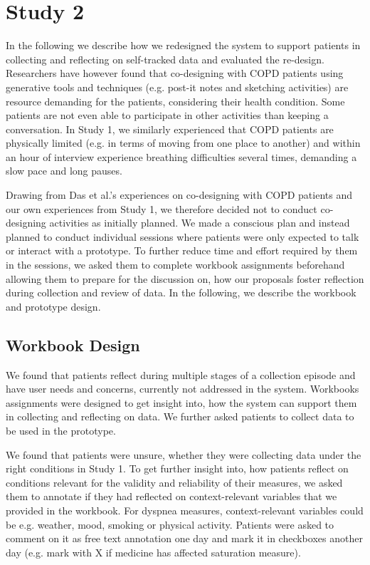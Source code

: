 \section{Study 2}
In the following we describe how we redesigned the system to support patients in collecting and reflecting on self-tracked data and evaluated the re-design. Researchers have however found that co-designing with COPD patients using generative tools and techniques (e.g. post-it notes and sketching activities) are resource demanding for the patients, considering their health condition. Some patients are not even able to participate in other activities than keeping a conversation. In Study 1, we similarly experienced that COPD patients are physically limited (e.g. in terms of moving from one place to another) and within an hour of interview experience breathing difficulties several times, demanding a slow pace and long pauses. 

Drawing from Das et al.’s experiences on co-designing with COPD patients \cite{Das} and our own experiences from Study 1, we therefore decided not to conduct co-designing activities as initially planned. We made a conscious plan and instead planned to conduct individual sessions where patients were only expected to talk or interact with a prototype. To further reduce time and effort required by them in the sessions, we asked them to complete workbook assignments beforehand allowing them to prepare for the discussion on, how our proposals foster reflection during collection and review of data. In the following, we describe the workbook and prototype design. 

\subsection{Workbook Design}
We found that patients reflect during multiple stages of a collection episode and have user needs and concerns, currently not addressed in the system. Workbooks assignments were designed to get insight into, how the system can support them in collecting and reflecting on data. We further asked patients to collect data to be used in the prototype. 

We found that patients were unsure, whether they were collecting data under the right conditions in Study 1. To get further insight into, how patients reflect on conditions relevant for the validity and reliability of their measures, we asked them to annotate if they had reflected on context-relevant variables that we provided in the workbook. For dyspnea measures, context-relevant variables could be e.g. weather, mood, smoking or physical activity. Patients were asked to comment on it as free text annotation one day and mark it in checkboxes another day (e.g. mark with X if medicine has affected saturation measure). 

